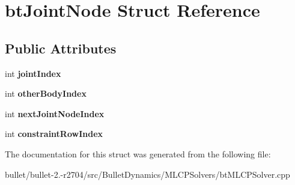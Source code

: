 \hypertarget{structbt_joint_node}{\section{bt\+Joint\+Node Struct Reference}
\label{structbt_joint_node}
}
\subsection*{Public Attributes}
\begin{DoxyCompactItemize}
\item 
\hypertarget{structbt_joint_node_a4d7a67a0f2ebb2ab55a8191c64bb6ae2}{int {\bfseries joint\+Index}}\label{structbt_joint_node_a4d7a67a0f2ebb2ab55a8191c64bb6ae2}

\item 
\hypertarget{structbt_joint_node_aea089efa0de09dd98abb0153f2524b35}{int {\bfseries other\+Body\+Index}}\label{structbt_joint_node_aea089efa0de09dd98abb0153f2524b35}

\item 
\hypertarget{structbt_joint_node_a1c050343ce885c74a420229ea6f0d066}{int {\bfseries next\+Joint\+Node\+Index}}\label{structbt_joint_node_a1c050343ce885c74a420229ea6f0d066}

\item 
\hypertarget{structbt_joint_node_a3fb9ebc744005c5788a250eb17d813c3}{int {\bfseries constraint\+Row\+Index}}\label{structbt_joint_node_a3fb9ebc744005c5788a250eb17d813c3}

\end{DoxyCompactItemize}


The documentation for this struct was generated from the following file\+:\begin{DoxyCompactItemize}
\item 
bullet/bullet-\/2.-\/r2704/src/\+Bullet\+Dynamics/\+M\+L\+C\+P\+Solvers/bt\+M\+L\+C\+P\+Solver.\+cpp\end{DoxyCompactItemize}
